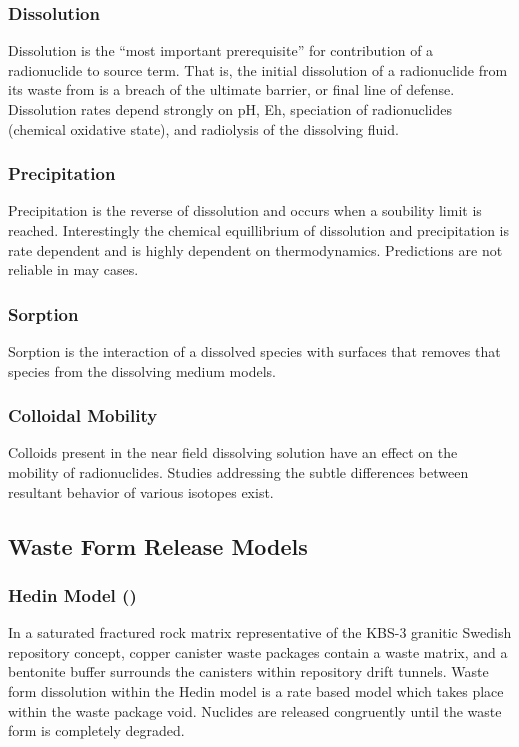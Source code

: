 \subsubsection{Dissolution}

Dissolution is the ``most important prerequisite'' for contribution of a
radionuclide to source term.\cite{bracke_safety_2008} That is, the initial 
dissolution of a radionuclide from its waste from is a breach of the ultimate 
barrier, or final line of defense. Dissolution rates depend strongly on pH, Eh,
speciation of radionuclides (chemical oxidative state), and radiolysis of the
dissolving fluid.

\subsubsection{Precipitation}

Precipitation is the reverse of dissolution and occurs when a soubility limit
is reached. Interestingly the chemical equillibrium of dissolution and
precipitation is rate dependent and is highly dependent on thermodynamics.
Predictions are not reliable in may cases.

\subsubsection{Sorption}

Sorption is the interaction of a dissolved species with surfaces that removes
that species from the dissolving medium models.


\subsubsection{Colloidal Mobility}

Colloids present in the near field dissolving solution have an effect on the
mobility of radionuclides. Studies addressing the subtle differences between 
resultant behavior of various isotopes exist.

\subsection{Waste Form Release Models}

\subsubsection{Hedin Model (\cite{hedin_integrated_2002})}

In a saturated fractured rock matrix representative of the KBS-3 granitic
Swedish repository concept, copper canister waste packages contain a waste
matrix, and a bentonite buffer surrounds the canisters within repository drift
tunnels. Waste form dissolution within the Hedin model is a rate based model
which takes place within the waste package void. Nuclides are released
congruently until the waste form is completely degraded.
\cite{hedin_integrated_2002} 

